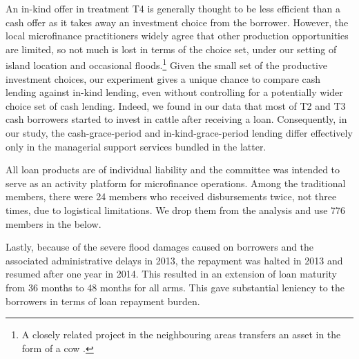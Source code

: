 	An in-kind offer in treatment \textsf{T4} is generally thought to be less efficient than a cash offer as it takes away an investment choice from the borrower. However, the local microfinance practitioners widely agree that other production opportunities are limited, so not much is lost in terms of the choice set, under our setting of island location and occasional floods.\footnote{A closely related project in the neighbouring areas transfers an asset in the form of a cow \citep{BandieraBRAC2017}. }  Given the small set of the productive investment choices, our experiment gives a unique chance to compare cash lending against in-kind lending, even without controlling for a potentially wider choice set of cash lending. 
	Indeed, we found in our data that most of \textsf{T2} and \textsf{T3} cash borrowers started to invest in cattle after receiving a loan. Consequently, in our study, the cash-grace-period and in-kind-grace-period lending differ effectively only in the managerial support services bundled in the latter. 

	All loan products are of individual liability and the committee was intended to serve as an activity platform for microfinance operations. Among the \textsf{traditional} members, there were 24 members who received disbursements twice, not three times, due to logistical limitations. We drop them from the analysis and use 776 members in the below. %

	Lastly, because of the severe flood damages caused on borrowers and the associated administrative delays in 2013, the repayment was halted in 2013 and resumed after one year in 2014. This resulted in an extension of loan maturity from 36 months to 48 months for all arms. This gave substantial leniency to the borrowers in terms of loan repayment burden. 

